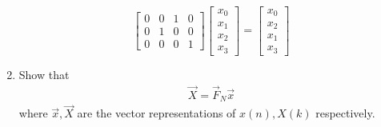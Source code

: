 \documentclass[journal,12pt,twocolumn]{IEEEtran}
\renewcommand\thesection{\arabic{section}}
\begin{document}
\begin{enumerate}[label=\thesection.\arabic*]
\[\begin{bmatrix}
    0 & 0 & 1 & 0 \\
    0 & 1 & 0 & 0 \\
    0 & 0 & 0 & 1
\end{bmatrix}
\begin{bmatrix}
    x_0\\
    x_1\\
    x_2\\
    x_3
\end{bmatrix}
=
\begin{bmatrix}
    x_0\\
    x_2\\
    x_1\\
    x_3
\end{bmatrix}
\]
\item Show that 
    \begin{align}
	    \vec{X} = \vec{F}_N \vec{x}
	    \label{eq:dft-mat-def}
    \end{align}
		where $\vec{x}, \vec{X}$ are the vector representations of $x(n), X(k)$ respectively.


\end{enumerate}
\end{document}
